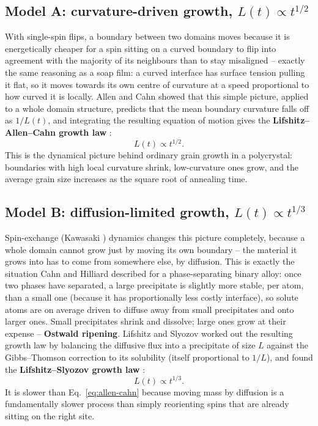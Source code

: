 \documentclass[11pt]{article}
\begin{document}
\subsection{Model A: curvature-driven growth, $L(t) \propto t^{1/2}$}

With single-spin flips, a boundary between two domains moves because it
is energetically cheaper for a spin sitting on a curved boundary to flip
into agreement with the majority of its neighbours than to stay
misaligned -- exactly the same reasoning as a soap film: a curved
interface has surface tension pulling it flat, so it moves towards its
own centre of curvature at a speed proportional to how curved it is
locally. Allen and Cahn showed that this simple picture, applied to a
whole domain structure, predicts that the mean boundary curvature falls
off as $1/L(t)$, and integrating the resulting equation of motion gives
the \textbf{Lifshitz--Allen--Cahn growth law} \cite{Lifshitz1962,AllenCahn1979}:
\begin{equation}
L(t) \propto t^{1/2}.
\label{eq:allen-cahn}
\end{equation}
This is the dynamical picture behind ordinary grain growth in a
polycrystal: boundaries with high local curvature shrink, low-curvature
ones grow, and the average grain size increases as the square root of
annealing time.

\subsection{Model B: diffusion-limited growth, $L(t) \propto t^{1/3}$}

Spin-exchange (Kawasaki \cite{Kawasaki1966}) dynamics changes this
picture completely, because a whole domain cannot grow just by moving its
own boundary -- the material it grows into has to come from somewhere
else, by diffusion. This is exactly the situation Cahn and Hilliard
described for a phase-separating binary alloy: once two phases have
separated, a large precipitate is slightly more stable, per atom, than a
small one (because it has proportionally less costly interface), so
solute atoms are on average driven to diffuse away from small
precipitates and onto larger ones. Small precipitates shrink and dissolve;
large ones grow at their expense -- \textbf{Ostwald ripening}. Lifshitz
and Slyozov worked out the resulting growth law by balancing the diffusive
flux into a precipitate of size $L$ against the Gibbs--Thomson correction
to its solubility (itself proportional to $1/L$), and found the
\textbf{Lifshitz--Slyozov growth law} \cite{LifshitzSlyozov1961}:
\begin{equation}
L(t) \propto t^{1/3}.
\label{eq:lifshitz-slyozov}
\end{equation}
It is slower than Eq.~\eqref{eq:allen-cahn} because moving mass by
diffusion is a fundamentally slower process than simply reorienting spins
that are already sitting on the right site.
\end{document}
